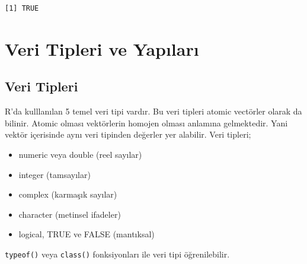 \documentclass[
  letterpaper,
  DIV=11,
  numbers=noendperiod]{scrreprt}
\begin{document}
\begin{verbatim}
[1] TRUE
\end{verbatim}

\chapter{Veri Tipleri ve
Yapıları}\label{veri-tipleri-ve-yapux131larux131}

\section{Veri Tipleri}\label{veri-tipleri}

R'da kulllanılan 5 temel veri tipi vardır. Bu veri tipleri atomic
vectörler olarak da bilinir. Atomic olması vektörlerin homojen olması
anlamına gelmektedir. Yani vektör içerisinde aynı veri tipinden değerler
yer alabilir. Veri tipleri;

\begin{itemize}
\item
  numeric veya double (reel sayılar)
\item
  integer (tamsayılar)
\item
  complex (karmaşık sayılar)
\item
  character (metinsel ifadeler)
\item
  logical, TRUE ve FALSE (mantıksal)
\end{itemize}

\texttt{typeof()} veya \texttt{class()} fonksiyonları ile veri tipi
öğrenilebilir.
\end{document}
